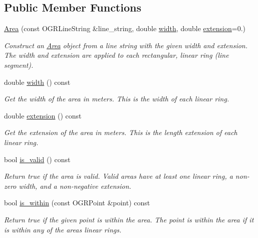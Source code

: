\subsection*{Public Member Functions}
\begin{DoxyCompactItemize}
\item 
\hyperlink{classgeo_1_1Area_ade2820a667effacf5147a4873e52bba5}{Area} (const O\+G\+R\+Line\+String \&line\+\_\+string, double \hyperlink{classgeo_1_1Area_a2069d731b316767105af529c9473f3a6}{width}, double \hyperlink{classgeo_1_1Area_aded96bcf3e373315755f87579a10098a}{extension}=0.)
\begin{DoxyCompactList}\small\item\em Construct an \hyperlink{classgeo_1_1Area}{Area} object from a line string with the given width and extension. The width and extension are applied to each rectangular, linear ring (line segment). \end{DoxyCompactList}\item 
double \hyperlink{classgeo_1_1Area_a2069d731b316767105af529c9473f3a6}{width} () const 
\begin{DoxyCompactList}\small\item\em Get the width of the area in meters. This is the width of each linear ring. \end{DoxyCompactList}\item 
double \hyperlink{classgeo_1_1Area_aded96bcf3e373315755f87579a10098a}{extension} () const 
\begin{DoxyCompactList}\small\item\em Get the extension of the area in meters. This is the length extension of each linear ring. \end{DoxyCompactList}\item 
bool \hyperlink{classgeo_1_1Area_ad802b7acb44e30984ec21018bca63460}{is\+\_\+valid} () const 
\begin{DoxyCompactList}\small\item\em Return true if the area is valid. Valid areas have at least one linear ring, a non-\/zero width, and a non-\/negative extension. \end{DoxyCompactList}\item 
bool \hyperlink{classgeo_1_1Area_a0bbd39e81f67912b91db243825594c45}{is\+\_\+within} (const O\+G\+R\+Point \&point) const 
\begin{DoxyCompactList}\small\item\em Return true if the given point is within the area. The point is within the area if it is within any of the area\textquotesingle{}s linear rings. \end{DoxyCompactList}\end{DoxyCompactItemize}
